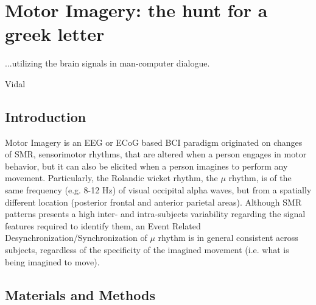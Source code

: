 \chapter{Motor Imagery: the hunt for a greek letter}
\label{chapter:five}
\epigraph{...utilizing the brain signals in man-computer dialogue.}{Vidal}

\section{Introduction}

Motor Imagery is an EEG or ECoG based BCI paradigm originated on changes of SMR, sensorimotor rhythms, that are altered when a person engages in motor behavior, but it can also be elicited when a person imagines to perform any movement. Particularly, the Rolandic wicket rhythm, the $\mu$ rhythm, is of the same frequency (e.g. 8-12 Hz) of visual occipital alpha waves, but from a spatially different location (posterior frontal and anterior parietal areas)\cite{WolpawJonathanR2012}.   Although SMR patterns presents a high inter- and intra-subjects variability regarding the signal features required to identify them, an Event Related Desynchronization/Synchronization of $\mu$ rhythm is in general consistent across subjects, regardless of the specificity of the imagined movement (i.e. what is being imagined to move).

\section{Materials and Methods}

